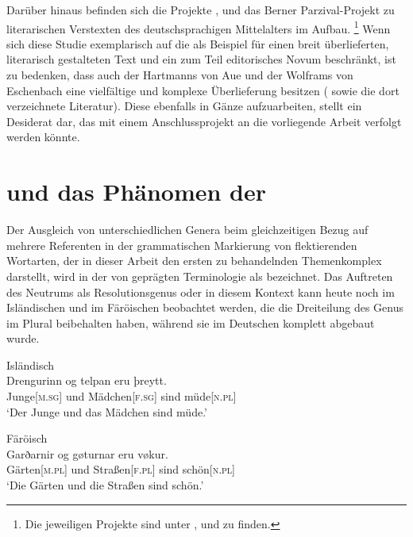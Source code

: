Darüber hinaus befinden sich die Projekte 
\autocite{iwdigital},  \autocite{ldmdigital} und das
Berner Parzival-Projekt \autocite{parzivalprojekt} zu literarischen Verstexten
des deutschsprachigen Mittelalters im Aufbau.%
%
	\footnote{Die jeweiligen Projekte sind unter ,
	 und  zu finden.}
%
Wenn sich diese Studie exemplarisch auf die \KC{} als Beispiel für einen breit
überlieferten, literarisch gestalteten Text und ein zum Teil editorisches Novum
beschränkt, ist zu bedenken, dass auch der  Hartmanns von
Aue und der  Wolframs von
Eschenbach eine vielfältige und komplexe
Überlieferung besitzen (\cite[vgl.][s.\,v.~\textit{:
}, \textit{: }]{hsc} sowie
die dort verzeichnete Literatur). Diese ebenfalls in Gänze aufzuarbeiten,
stellt ein Desiderat dar, das mit einem Anschlussprojekt an die vorliegende
Arbeit verfolgt werden könnte.

\section{ und das Phänomen der }
\label{sec:einlgendres}

Der Ausgleich von unterschiedlichen Genera beim gleichzeitigen Bezug auf
mehrere Referenten in der grammatischen Markierung von flektierenden Wortarten,
der in dieser Arbeit den ersten zu behandelnden Themenkomplex darstellt, wird
in der von \citet{corbett1983} geprägten Terminologie als  bezeichnet. Das Auftreten des Neutrums als Resolutionsgenus oder
 \autocites{corbett1999}{wechsler2009} in diesem Kontext kann heute
noch im Isländischen  und im Färöischen
 beobachtet werden, die die Dreiteilung des Genus im
Plural beibehalten haben, während sie im Deutschen komplett abgebaut wurde.

\begin{exe}
\ex \label{ex:modgermbeide}
\begin{xlist}
\ex \label{ex:modgermbeide_1}
	\langinfo%
		{Isländisch}%
		{}%
		{\cites[nach][283]{corbett1991}[569]{wechsler2009}}\\
	\gll Drengurinn og telpan eru þreytt. \\
		Junge[\textsc{m.sg}] und Mädchen[\textsc{f.sg}] sind
		müde[\textsc{n.pl}] \\
	\trans `Der Junge und das Mädchen sind müde.'

\ex \label{ex:modgermbeide_2}
	\langinfo%
		{Färöisch}%
		{}%
		{\cite[nach][225]{thrainsson2004}}\\
	\gll Garðarnir og gøturnar eru vøkur. \\
		Gärten[\textsc{m.pl}] und Straßen[\textsc{f.pl}] sind
		schön[\textsc{n.pl}] \\
	\trans `Die Gärten und die Straßen sind schön.'
\end{xlist}
\end{exe}

